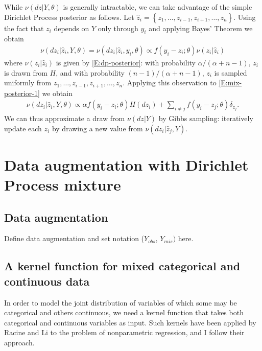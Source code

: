 \documentclass[letterpaper,11pt]{article}
\begin{document}
While $\nu(dz|Y, \theta)$ is generally intractable, we can take advantage of the simple Dirichlet Process posterior as follows. Let $\hat{z}_i = \left\{ z_1, \dots, z_{i-1}, z_{i+1}, \dots, z_n \right\}$. Using the fact that $z_i$ depends on $Y$ only through $y_i$ and applying Bayes' Theorem we obtain
\begin{align}\label{E:mix-posterior-1}
    \nu(dz_i | \hat{z}_i, Y, \theta) = \nu(dz_i | \hat{z}_i, y_i, \theta) \propto f(y_i - z_i; \theta) \nu(z_i | \hat{z}_i)
\end{align}
where $\nu(z_i | \hat{z}_i)$ is given by \eqref{E:dp-posterior}: with probability $\alpha/(\alpha + n - 1)$, $z_i$ is drawn from $H$, and with probability $(n-1)/(\alpha + n - 1)$, $z_i$ is sampled uniformly from $z_1, \dots, z_{i-1}, z_{i+1}, \dots, z_n$. Applying this observation to \eqref{E:mix-posterior-1} we obtain
\begin{align}\label{E:mix-posterior}
    \nu(dz_i|\hat{z}_i, Y, \theta) \propto \alpha f(y_i - z_i; \theta) H(dz_i) + \sum_{i\ne j} f(y_i - z_j; \theta) \delta_{z_j}.
\end{align}
We can thus approximate a draw from $\nu(dz|Y)$ by Gibbs sampling: iteratively update each $z_i$ by drawing a new value from $\nu(dz_i|\hat{z}_j, Y)$.

\section{Data augmentation with Dirichlet Process mixture}

\subsection{Data augmentation}

Define data augmentation and set notation ($Y_{obs}$, $Y_{mis})$ here.

\subsection{A kernel function for mixed categorical and continuous data}

In order to model the joint distribution of variables of which some may be categorical and others continuous, we need a kernel function that takes both categorical and continuous variables as input. Such kernels have been applied by Racine and Li \cite{rl04} to the problem of nonparametric regression, and I follow their approach.
\end{document}
